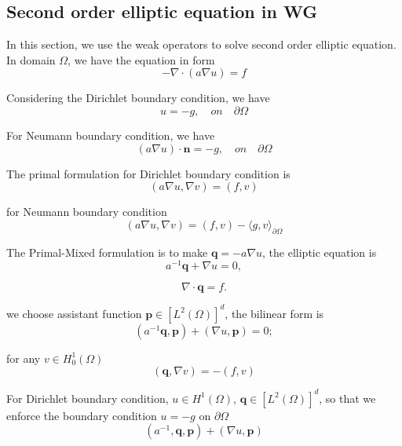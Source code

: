 \subsection{Second order elliptic equation in WG}
In this section, we use the weak operators to solve second order elliptic equation. In domain $ \Omega $, we have the equation in form
\begin{equation}
- \nabla \cdot (a \nabla u) = f
\end{equation}

Considering the Dirichlet boundary condition, we have
\begin{equation}
u = -g, \quad on \quad \partial \Omega
\end{equation}

For Neumann boundary condition, we have
\begin{equation}
(a \nabla u) \cdot \mathbf{n} = -g, \quad on \quad \partial \Omega
\end{equation}

The primal formulation for Dirichlet boundary condition is 
\begin{equation}
(a \nabla u, \nabla v) = (f, v)
\end{equation}

for Neumann boundary condition
\begin{equation}
(a \nabla u, \nabla v) = (f, v) - \langle g, v \rangle_{\partial \Omega}
\end{equation}

The Primal-Mixed formulation is to make $ \mathbf{q} = -a \nabla u $, the elliptic equation is 
\begin{equation}
a^{-1}\mathbf{q} + \nabla u = 0,
\end{equation}

\begin{equation}
\nabla \cdot \mathbf{q} = f.
\end{equation}

we choose assistant function $ \mathbf{p} \in [L^{2}(\Omega)]^{d} $, the bilinear form is
\begin{equation}
(a^{-1} \mathbf{q}, \mathbf{p}) + (\nabla u, \mathbf{p}) = 0;
\end{equation}

for any $ v \in H_{0}^{1} (\Omega) $
\begin{equation}
(\mathbf{q}, \nabla v) = -(f, v)
\end{equation}

For Dirichlet boundary condition, $ u \in H^{1}(\Omega) $, $ \mathbf{q} \in [L^{2} (\Omega)]^{d} $, so that we enforce the boundary condition $ u = -g  $ on $ \partial \Omega $
\begin{equation}
(a^{-1}, \mathbf{q}, \mathbf{p}) + (\nabla u, \mathbf{p})
\end{equation}

